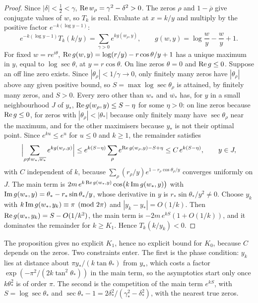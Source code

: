 \begin{proof}
Since $|\delta|<\frac12<\gamma$, $\operatorname{Re} w_\rho=\gamma^2-\delta^2>0$. The zeros $\rho$ and $1-\overline\rho$ give conjugate values of $w$, so $T_k$ is real. Evaluate at $x=k/y$ and multiply by the positive factor $e^{-k(\log y-1)}$:
\[
e^{-k(\log y-1)}T_k(k/y)=\sum_{\gamma>0}e^{k g(w_\rho,y)},\qquad g(w,y)=\log\frac wy-\frac wy+1 .
\]
For fixed $w=re^{i\theta}$, $\operatorname{Re} g(w,y)=\log(r/y)-r\cos\theta/y+1$ has a unique maximum in $y$, equal to $\log\sec\theta$, at $y=r\cos\theta$. On line zeros $\theta=0$ and $\operatorname{Re} g\le0$. Suppose an off line zero exists. Since $|\theta_\rho|<1/\gamma\to0$, only finitely many zeros have $|\theta_\rho|$ above any given positive bound, so $S=\max\log\sec\theta_\rho$ is attained, by finitely many zeros, and $S>0$. Every zero other than $w_*$ and $\overline{w_*}$ has, for $y$ in a small neighbourhood $J$ of $y_*$, $\operatorname{Re} g(w_\rho,y)\le S-\eta$ for some $\eta>0$: on line zeros because $\operatorname{Re} g\le0$, for zeros with $|\theta_\rho|<|\theta_*|$ because only finitely many have $\sec\theta_\rho$ near the maximum, and for the other maximisers because $y_*$ is not their optimal point. Since $e^{ku}\le e^u$ for $u\le0$ and $k\ge1$, the remainder satisfies
\[
\Bigl|\sum_{\rho\ne w_*,\overline{w_*}}e^{kg(w_\rho,y)}\Bigr|\le e^{k(S-\eta)}\sum_\rho e^{\operatorname{Re} g(w_\rho,y)-S+\eta}\le C\,e^{k(S-\eta)},\qquad y\in J,
\]
with $C$ independent of $k$, because $\sum_\rho (r_\rho/y)e^{1-r_\rho\cos\theta_\rho/y}$ converges uniformly on $J$. The main term is $2m\,e^{k\operatorname{Re} g(w_*,y)}\cos\bigl(k\operatorname{Im} g(w_*,y)\bigr)$ with $\operatorname{Im} g(w_*,y)=\theta_*-r_*\sin\theta_*/y$, whose derivative in $y$ is $r_*\sin\theta_*/y^2\ne0$. Choose $y_k$ with $k\operatorname{Im} g(w_*,y_k)\equiv\pi\pmod{2\pi}$ and $|y_k-y_*|=O(1/k)$. Then $\operatorname{Re} g(w_*,y_k)=S-O(1/k^2)$, the main term is $-2m\,e^{kS}(1+O(1/k))$, and it dominates the remainder for $k\ge K_1$. Hence $T_k(k/y_k)<0$.
\end{proof}

The proposition gives no explicit $K_1$, hence no explicit bound for $K_0$, because $C$ depends on the zeros. Two constraints enter. The first is the phase condition: $y_k$ lies at distance about $\pi y_*/(k\tan\theta_*)$ from $y_*$, which costs a factor $\exp(-\pi^2/(2k\tan^2\theta_*))$ in the main term, so the asymptotics start only once $k\theta_*^2$ is of order $\pi$. The second is the competition of the main term $e^{kS}$, with $S=\log\sec\theta_*$ and $\sec\theta_*-1=2\delta_*^2/(\gamma_*^2-\delta_*^2)$, with the nearest true zeros.

